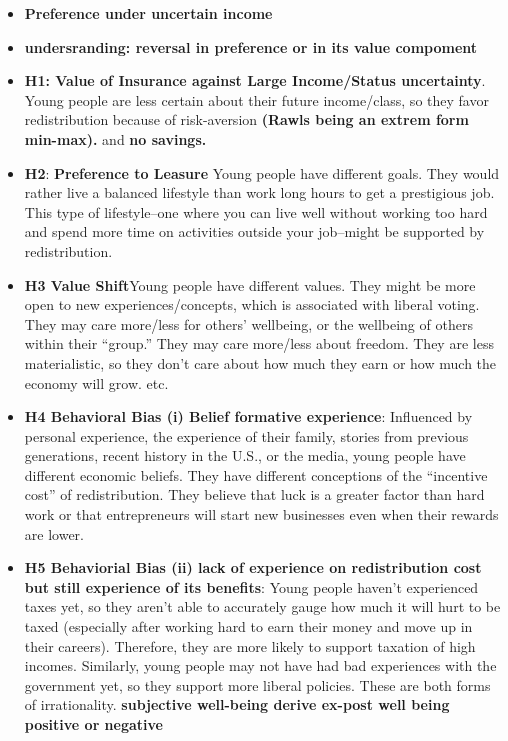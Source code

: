 \documentclass[a4paper,11pt,oneside,headsepline]{scrartcl}
\begin{document}
\begin{itemize}
    \item \textbf{Preference under uncertain income }
\end{itemize}
\begin{itemize}
    \item \textbf{undersranding: reversal in preference or in its value compoment}
\end{itemize}
\begin{itemize}
    \item \textbf{H1}\textbf{: Value of Insurance against Large Income/Status uncertainty}.  Young people are less certain about their future income/class, so they favor redistribution because of risk-aversion\textbf{ (Rawls being an extrem form min-max).} and \textbf{no savings.} 
    \item \textbf{H2}: \textbf{Preference to Leasure} Young people have different goals. They would rather live a balanced lifestyle than work long hours to get a prestigious job. This type of lifestyle--one where you can live well without working too hard and spend more time on activities outside your job--might be supported by redistribution. 
    \item \textbf{H3 Value Shift}Young people have different values. They might be more open to new experiences/concepts, which is associated with liberal voting. They may care more/less for others' wellbeing, or the wellbeing of others within their ``group.'' They may care more/less about freedom. They are less materialistic, so they don't care about how much they earn or how much the economy will grow. etc.
    \item \textbf{H4 Behavioral Bias  (i) Belief  formative experience}: Influenced by personal experience, the experience of their family, stories from previous generations, recent history in the U.S., or the media, young people have different economic beliefs. They have different conceptions of the ``incentive cost'' of redistribution. They believe that luck is a greater factor than hard work or that entrepreneurs will start new businesses even when their rewards are lower.
    \item \textbf{H5 Behaviorial Bias (ii) lack of experience on redistribution cost but still experience of its benefits}: Young people haven't experienced taxes yet, so they aren't able to accurately gauge how much it will hurt to be taxed (especially after working hard to earn their money and move up in their careers). Therefore, they are more likely to support taxation of high incomes. Similarly, young people may not have had bad experiences with the government yet, so they support more liberal policies. These are both forms of irrationality. \textbf{subjective well-being derive ex-post well being positive or negative }

\end{itemize}
\end{document}
